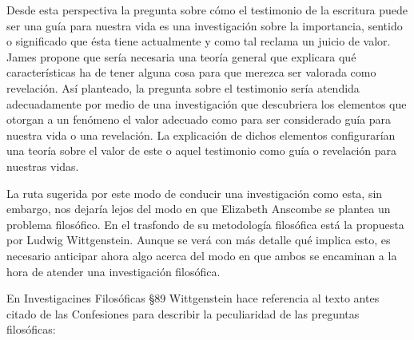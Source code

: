 
Desde esta perspectiva la pregunta sobre cómo el testimonio de la escritura
puede ser una guía para nuestra vida es una investigación sobre la importancia,
sentido o significado que ésta tiene actualmente y como tal reclama un juicio de
valor. James propone que sería necesaria una teoría general que explicara qué
características ha de tener alguna cosa para que merezca ser valorada como
revelación. Así planteado, la pregunta sobre el testimonio sería atendida
adecuadamente por medio de una investigación que descubriera los elementos que
otorgan a un fenómeno el valor adecuado como para ser considerado guía para
nuestra vida o una revelación. La explicación de dichos elementos configurarían
una teoría sobre el valor de este o aquel testimonio como guía o revelación para
nuestras vidas.

La ruta sugerida por este modo de conducir una investigación como esta, sin
embargo, nos dejaría lejos del modo en que Elizabeth Anscombe se plantea un
problema filosófico. En el trasfondo de su metodología filosófica está la
propuesta por Ludwig Wittgenstein. Aunque se verá con más detalle qué implica
esto, es necesario anticipar ahora algo acerca del modo en que ambos se
encaminan a la hora de atender una investigación filosófica.

En Investigacines Filosóficas \S89 Wittgenstein hace referencia al texto antes
citado de las Confesiones para describir la peculiaridad de las preguntas
filosóficas:

